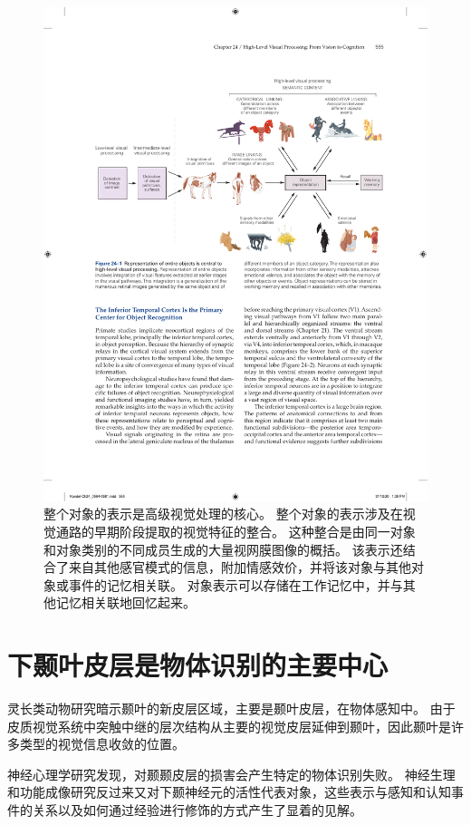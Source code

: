 \begin{figure}[htbp]
	\centering
	\includegraphics[width=0.9\linewidth]{chap24/fig_24_1}
	\caption{整个对象的表示是高级视觉处理的核心。 整个对象的表示涉及在视觉通路的早期阶段提取的视觉特征的整合。 这种整合是由同一对象和对象类别的不同成员生成的大量视网膜图像的概括。 该表示还结合了来自其他感官模式的信息，附加情感效价，并将该对象与其他对象或事件的记忆相关联。 对象表示可以存储在工作记忆中，并与其他记忆相关联地回忆起来。}
	\label{fig:24_1}
\end{figure}



\section{下颞叶皮层是物体识别的主要中心}

灵长类动物研究暗示颞叶的新皮层区域，主要是颞叶皮层，在物体感知中。
由于皮质视觉系统中突触中继的层次结构从主要的视觉皮层延伸到颞叶，因此颞叶是许多类型的视觉信息收敛的位置。


神经心理学研究发现，对颞颞皮层的损害会产生特定的物体识别失败。
神经生理和功能成像研究反过来又对下颞神经元的活性代表对象，这些表示与感知和认知事件的关系以及如何通过经验进行修饰的方式产生了显着的见解。


